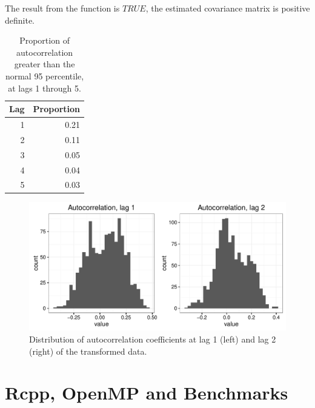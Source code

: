 \documentclass[a4paper,11pt,fleqn,twoside,notitlepage]{report}\usepackage[]{graphicx}\usepackage[]{color}
\makeatletter
\def\maxwidth{ %
  \ifdim\Gin@nat@width>\linewidth
    \linewidth
  \else
    \Gin@nat@width
  \fi
}
\newenvironment{knitrout}{}{} %
\makeatother
\begin{document}
The result from the function is $TRUE$, the estimated covariance matrix is positive definite. 

\begin{table}[ht]
\centering
\begin{tabular}{rr}
  \hline
Lag & Proportion \\ 
  \hline
  1 & 0.21 \\ 
    2 & 0.11 \\ 
    3 & 0.05 \\ 
    4 & 0.04 \\ 
    5 & 0.03 \\ 
   \hline
\end{tabular}
\caption{Proportion of autocorrelation greater than the normal 95 percentile, at lags 1 through 5.} 
\label{ACFtable}
\end{table}

\begin{center}
\begin{knitrout}
\color{fgcolor}\begin{figure}[!ht]
\includegraphics[width=\maxwidth]{figure/FigureACF-1} \caption[Distribution of autocorrelation coefficients at lag 1 (left) and lag 2 (right) of the transformed data]{Distribution of autocorrelation coefficients at lag 1 (left) and lag 2 (right) of the transformed data.}\label{fig:FigureACF}
\end{figure}


\end{knitrout}
\end{center}
\newpage
\section{Rcpp, OpenMP and Benchmarks}\label{Benchmarks}
\end{document}
